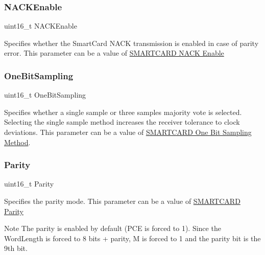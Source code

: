 \subsubsection{\texorpdfstring{N\+A\+C\+K\+Enable}{NACKEnable}}
{\footnotesize\ttfamily uint16\+\_\+t N\+A\+C\+K\+Enable}

Specifies whether the Smart\+Card N\+A\+CK transmission is enabled in case of parity error. This parameter can be a value of \hyperlink{group___s_m_a_r_t_c_a_r_d___n_a_c_k___enable}{S\+M\+A\+R\+T\+C\+A\+RD N\+A\+CK Enable} \mbox{\label{struct_s_m_a_r_t_c_a_r_d___init_type_def_aa9e1e2730d3764f6bcc994a41f30c28c}} 
\subsubsection{\texorpdfstring{One\+Bit\+Sampling}{OneBitSampling}}
{\footnotesize\ttfamily uint16\+\_\+t One\+Bit\+Sampling}

Specifies whether a single sample or three samples\textquotesingle{} majority vote is selected. Selecting the single sample method increases the receiver tolerance to clock deviations. This parameter can be a value of \hyperlink{group___s_m_a_r_t_c_a_r_d___one_bit___sampling}{S\+M\+A\+R\+T\+C\+A\+RD One Bit Sampling Method}. \mbox{\label{struct_s_m_a_r_t_c_a_r_d___init_type_def_ab9ca95a28592c8639b87be21d8ec2026}} 
\subsubsection{\texorpdfstring{Parity}{Parity}}
{\footnotesize\ttfamily uint16\+\_\+t Parity}

Specifies the parity mode. This parameter can be a value of \hyperlink{group___s_m_a_r_t_c_a_r_d___parity}{S\+M\+A\+R\+T\+C\+A\+RD Parity} \begin{DoxyNote}{Note}
The parity is enabled by default (P\+CE is forced to 1). Since the Word\+Length is forced to 8 bits + parity, M is forced to 1 and the parity bit is the 9th bit. 
\end{DoxyNote}
\mbox{\label{struct_s_m_a_r_t_c_a_r_d___init_type_def_a5c9d1e760b400d2502c03b0391606f90}} 
